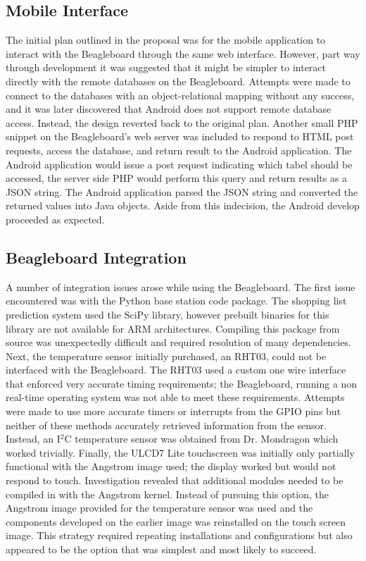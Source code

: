 \documentclass[11pt]{article} %
\begin{document}
\subsection{Mobile Interface}
The initial plan outlined in the proposal was for the mobile application to interact with the Beagleboard through the same web interface. However, part way through development it was suggested that it might be simpler to interact directly with the remote databases on the Beagleboard. Attempts were made to connect to the databases with an object-relational mapping without any success, and it was later discovered that Android does not support remote database access. Instead, the design reverted back to the original plan. Another small PHP snippet on the Beagleboard's web server was included to respond to HTML post requests, access the database, and return result to the Android application. The Android application would issue a post request indicating which tabel should be accessed, the server side PHP would perform this query and return results as a JSON string. The Android application parsed the JSON string and converted the returned values into Java objects. Aside from this indecision, the Android develop proceeded as expected.

\subsection{Beagleboard Integration}
A number of integration issues arose while using the Beagleboard. The first issue encountered was with the Python base station code package. The shopping list prediction system used the SciPy library, however prebuilt binaries for this library are not available for ARM architectures. Compiling this package from source was unexpectedly difficult and required resolution of many dependencies. Next, the temperature sensor initially purchased, an RHT03, could not be interfaced with the Beagleboard. The RHT03 used a custom one wire interface that enforced very accurate timing requirements; the Beagleboard, running a non real-time operating system was not able to meet these requirements. Attempts were made to use more accurate timers or interrupts from the GPIO pins but neither of these methods accurately retrieved information from the sensor. Instead, an I$^2$C temperature sensor was obtained from Dr. Mondragon which worked trivially. Finally, the ULCD7 Lite touchscreen was initially only partially functional with the Angstrom image used; the display worked but would not respond to touch. Investigation revealed that additional modules needed to be compiled in with the Angstrom kernel. Instead of pursuing this option, the Angstrom image provided for the temperature sensor was used and the components developed on the earlier image was reinstalled on the touch screen image. This strategy required repeating installations and configurations but also appeared to be the option that was simplest and most likely to succeed.
\end{document}
